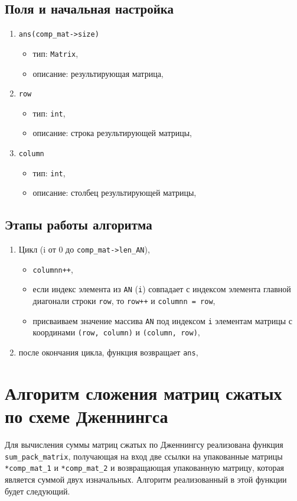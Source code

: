 \subsection*{Поля и начальная настройка}
\begin{enumerate}
	\item \texttt{ans(comp\_mat->size)}
	\begin{itemize}
		\item тип: \texttt{Matrix},
		\item описание: результирующая матрица,
	\end{itemize}
	
	\item \texttt{row}
	\begin{itemize}
		\item тип: \texttt{int},
		\item описание: строка результирующей матрицы,
	\end{itemize}
	
	\item \texttt{column}
	\begin{itemize}
		\item тип: \texttt{int},
		\item описание: столбец результирующей матрицы,
	\end{itemize}
\end{enumerate}

\subsection*{Этапы работы алгоритма}
\begin{enumerate}
	\item Цикл (i от 0 до \texttt{comp\_mat->len\_AN}),
	\begin{itemize}
		\item \texttt{columnn++},
		\item если индекс элемента из \texttt{AN} (\texttt{i}) совпадает с индексом элемента главной диагонали строки \texttt{row}, то \texttt{row++} и \texttt{columnn = row},
		\item присваиваем значение массива \texttt{AN} под индексом \texttt{i} элементам матрицы с координами \texttt{(row, column)} и \texttt{(column, row)},
	\end{itemize}
	\item после окончания цикла, функция возвращает \texttt{ans},
\end{enumerate}

\section{Алгоритм сложения матриц сжатых по схеме Дженнингса}
Для вычисления суммы матриц сжатых по Дженнингсу реализована функция \texttt{sum\_\-pack\_matrix}, получающая на вход две ссылки на упакованные матрицы \texttt{*comp\_mat\_1} и \texttt{*comp\_\-mat\_2} и возвращающая упакованную матрицу, которая является суммой двух изначальных. Алгоритм реализованный в этой функции будет следующий.
